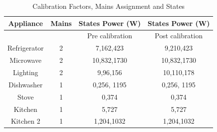 \documentclass[conference]{IEEEtran}
\begin{document}
\begin{table}
\caption{Calibration Factors, Mains Assignment and States}
\label{tab:calibration_factors}
\begin{tabular}{|c|c|c|c|}
\hline
Appliance & Mains & States Power (W)& States Power (W)\\
\hline
&&Pre calibration&Post calibration\\
\hline
Refrigerator & 2& 7,162,423 & 9,210,423\\
Microwave &2& 10,832,1730& 10,832,1730\\
Lighting & 2& 9,96,156&10,110,178\\
Dishwasher & 1& 0,256, 1195 & 0,256, 1195\\
Stove& 1 & 0,374& 0,374\\
Kitchen & 1& 5,727&5,727\\
Kitchen 2&1 & 1,204,1032&1,204,1032 \\
%
%
\hline
%
\end{tabular}
\end{table}
\end{document}
